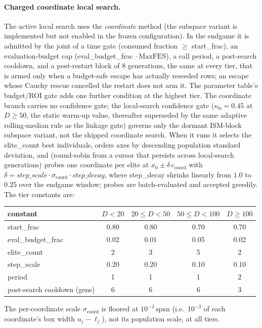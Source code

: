 \documentclass[algorithms,article,submit,moreauthors,pdftex]{Definitions/mdpi}
\begin{document}
\paragraph{Charged coordinate local search.}
The active local search uses the \emph{coordinate} method (the subspace variant is
implemented but not enabled in the frozen configuration).  In the endgame it is admitted
by the joint of a time gate (consumed fraction $\ge$ start\_frac), an
evaluation-budget cap (eval\_budget\_frac $\cdot\ \mathrm{MaxFES}$), a call period,
a post-search cooldown, and a post-restart block of $8$ generations, the same at
every tier, that is armed only when a budget-safe escape has actually reseeded
rows; an escape whose Cauchy rescue cancelled the restart does not arm it.
The parameter table's budget/ROI gate adds one further condition at the highest
tier.  The coordinate branch carries no confidence gate; the
local-search confidence gate ($\kappa_{\mathrm{ls}}=0.45$ at $D\ge 50$, the static
warm-up value, thereafter superseded by the same adaptive rolling-median rule
as the linkage gate) governs only the dormant ISM-block subspace variant, not
the shipped coordinate search.  When it runs
it selects the elite\_count best individuals, orders axes by descending
population standard deviation, and (round-robin from a cursor that persists across
local-search generations) probes one coordinate per elite at
$x_0 \pm \delta\,e_{\text{coord}}$ with
$\delta = step\_scale\cdot\sigma_{\text{coord}}\cdot step\_decay$, where
step\_decay shrinks linearly from $1.0$ to $0.25$ over the endgame window;
probes are batch-evaluated and accepted greedily.  The tier constants are:
\begin{center}
\small
\begin{tabular}{lcccc}
\toprule
constant & $D<20$ & $20\le D<50$ & $50\le D<100$ & $D\ge 100$\\
\midrule
start\_frac        & 0.80 & 0.80 & 0.70 & 0.70\\
eval\_budget\_frac & 0.02 & 0.01 & 0.05 & 0.02\\
elite\_count       & 2    & 3    & 5    & 2\\
step\_scale        & 0.20 & 0.20 & 0.10 & 0.10\\
period                      & 1    & 1    & 1    & 2\\
post-search cooldown (gens) & 6    & 6    & 6    & 3\\
\bottomrule
\end{tabular}
\end{center}
The per-coordinate scale $\sigma_{\text{coord}}$ is floored at $10^{-3}\,\mathrm{span}$ (i.e.\ $10^{-3}$ of each coordinate's box width $u_j-\ell_j$), not its population scale, at all tiers.
\end{document}
